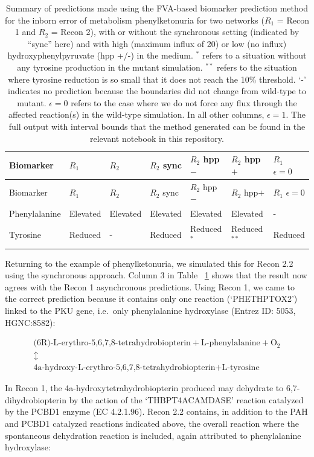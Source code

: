 \documentclass[10pt,a4paper,onecolumn]{article}
\begin{document}
\hypertarget{tbl:PKU_results}{}
\begin{longtable}[]{@{}lllllll@{}}
\caption{\label{tbl:PKU_results}Summary of predictions made using the
FVA-based biomarker prediction method for the inborn error of metabolism
phenylketonuria for two networks (\(R_1\) = Recon 1 and \(R_2\) = Recon
2), with or without the synchronous setting (indicated by ``sync'' here)
and with high (maximum influx of 20) or low (no influx)
hydroxyphenylpyruvate (hpp +/-) in the medium. \(^*\) refers to a
situation without any tyrosine production in the mutant simulation.
\(^{**}\) refers to the situation where tyrosine reduction is so small
that it does not reach the 10\% threshold. `-' indicates no prediction
because the boundaries did not change from wild-type to mutant.
\(\epsilon = 0\) refers to the case where we do not force any flux
through the affected reaction(s) in the wild-type simulation. In all
other columns, \(\epsilon = 1\). The full output with interval bounds
that the method generated can be found in the relevant notebook in this
repository. }\tabularnewline
\toprule
Biomarker & \(R_1\) & \(R_2\) & \(R_2\) sync & \(R_2\) hpp\(-\) &
\(R_2\) hpp\(+\) & \(R_1\) \(\epsilon = 0\)\tabularnewline
\midrule
\endfirsthead
\toprule
Biomarker & \(R_1\) & \(R_2\) & \(R_2\) sync & \(R_2\) hpp\(-\) &
\(R_2\) hpp\(+\) & \(R_1\) \(\epsilon = 0\)\tabularnewline
\midrule
\endhead
Phenylalanine & Elevated & Elevated & Elevated & Elevated & Elevated &
-\tabularnewline
Tyrosine & Reduced & - & Reduced & Reduced\(^*\) & Reduced\(^{**}\) &
Reduced\tabularnewline
\bottomrule
\end{longtable}

Returning to the example of phenylketonuria, we simulated this for Recon
2.2 using the synchronous approach. Column 3 in Table
~\ref{tbl:PKU_results} shows that the result now agrees with the Recon 1
asynchronous predictions. Using Recon 1, we came to the correct
prediction because it contains only one reaction (`PHETHPTOX2') linked
to the PKU gene, i.e.~only phenylalanine hydroxylase (Entrez ID: 5053,
HGNC:8582):

\begin{gather*}
\text{(6R)-L-erythro-5,6,7,8-tetrahydrobiopterin} + \text{L-phenylalanine} + \text{O}_2 \\
\updownarrow \\
\text{4a-hydroxy-L-erythro-5,6,7,8-tetrahydrobiopterin} + \text{L-tyrosine}
\end{gather*}

In Recon 1, the 4a-hydroxytetrahydrobiopterin produced may dehydrate to
6,7-dihydrobiopterin by the action of the `THBPT4ACAMDASE' reaction
catalyzed by the PCBD1 enzyme (EC 4.2.1.96). Recon 2.2 contains, in
addition to the PAH and PCBD1 catalyzed reactions indicated above, the
overall reaction where the spontaneous dehydration reaction is included,
again attributed to phenylalanine hydroxylase:
\end{document}
